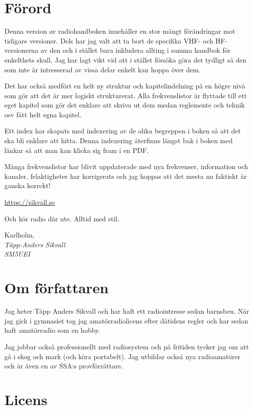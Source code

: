 \section*{Förord}

Denna version av radiohandboken innehåller en stor mängt förändringar mot
tidigare versioner. Dels har jag valt att ta bort de specifika VHF- och
HF-versionerna av den och i stället bara inkludera allting i samma handbok för
enkelthets skull. Jag har lagt vikt vid att i stället försöka göra det tydligt
så den som inte är intresserad av vissa delar enkelt kan hoppa över dem.

Det har också medfört en helt ny struktur och kapitelindelning på en högre
nivå som gör att det är mer logiskt strukturerat. Alla frekvenslistor är
flyttade till ett eget kapitel som gör det enklare att skriva ut dem medan
reglemente och teknik osv fått helt egna kapitel.

Ett index har skapats med indexering av de olika begreppen i boken så att det
ska bli enklare att hitta. Denna indexering återfinns längst bak i boken med
länkar så att man kan klicka sig fram i en PDF.

Många frekvenslistor har blivit uppdaterade med nya frekvenser, information
och kanaler, felaktigheter har korrigerats och jag hoppas att det mesta nu
faktiskt är ganska korrekt!

\url{https://sikvall.se}

Och kör radio där ute. Alltid med stil.

\vspace{4mm}

Karlholm, \DokumentDatum\\
\textit{Täpp-Anders Sikvall\\
	SM5UEI}

\section*{Om författaren}

Jag heter Täpp Anders Sikvall och har haft ett radiointresse sedan
barnsben. När jag gick i gymnasiet tog jag amatörradiolicens efter dåtidens
regler och har sedan haft amatörradio som en hobby.

Jag jobbar också professionellt med radiosystem och på fritiden tycker jag om
att gå i skog och mark (och köra portabelt). Jag utbildar också nya
radioamatörer och är även en av SSA:s provförrättare.

\section*{Licens}

